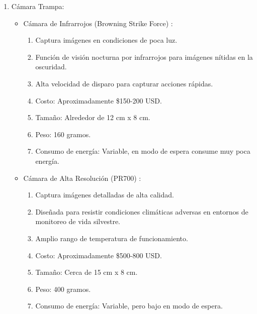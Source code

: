 \begin{enumerate}
\item Cámara Trampa:
\begin{itemize}
    \item Cámara de Infrarrojos (Browning Strike Force) \cite{98}:
\begin{enumerate}
        \item Captura imágenes en condiciones de poca luz.
        \item Función de visión nocturna por infrarrojos para imágenes nítidas en la oscuridad.
        \item Alta velocidad de disparo para capturar acciones rápidas.
        \item Costo: Aproximadamente \$150-200 USD.
        \item Tamaño: Alrededor de 12 cm x 8 cm.
        \item Peso: 160 gramos.
        \item Consumo de energía: Variable, en modo de espera consume muy poca energía.
\end{enumerate}
    \item Cámara de Alta Resolución (PR700) \cite{99}:
\begin{enumerate}
        \item Captura imágenes detalladas de alta calidad.
        \item Diseñada para resistir condiciones climáticas adversas en entornos de monitoreo de vida silvestre.
        \item Amplio rango de temperatura de funcionamiento.
        \item Costo: Aproximadamente \$500-800 USD.
        \item Tamaño: Cerca de 15 cm x 8 cm.
        \item Peso: 400 gramos.
        \item Consumo de energía: Variable, pero bajo en modo de espera.

\end{enumerate}
\end{itemize}


\end{enumerate}

